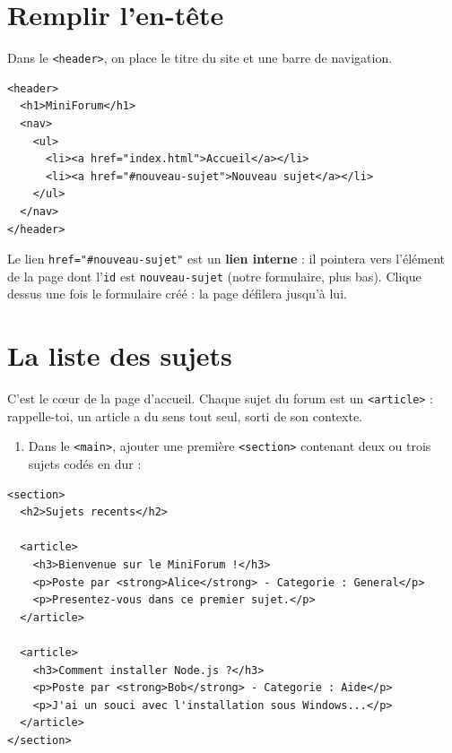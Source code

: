 \documentclass[a4paper,11pt]{article}
\begin{document}
\section{Remplir l'en-tête}

Dans le \texttt{<header>}, on place le titre du site et une barre de navigation.

\begin{lstlisting}[language=HTML5, caption={Contenu du header}]
<header>
  <h1>MiniForum</h1>
  <nav>
    <ul>
      <li><a href="index.html">Accueil</a></li>
      <li><a href="#nouveau-sujet">Nouveau sujet</a></li>
    </ul>
  </nav>
</header>
\end{lstlisting}

\begin{tcolorbox}[astuce, title={Le lien avec le \#}]
Le lien \texttt{href="\#nouveau-sujet"} est un \textbf{lien interne} : il pointera vers l'élément de la page dont l'\texttt{id} est \texttt{nouveau-sujet} (notre formulaire, plus bas). Clique dessus une fois le formulaire créé : la page défilera jusqu'à lui.
\end{tcolorbox}

\section{La liste des sujets}

C'est le cœur de la page d'accueil. Chaque sujet du forum est un \texttt{<article>} : rappelle-toi, un article a du sens tout seul, sorti de son contexte.

\begin{enumerate}
  \item Dans le \texttt{<main>}, ajouter une première \texttt{<section>} contenant deux ou trois sujets codés en dur :
\end{enumerate}

\begin{lstlisting}[language=HTML5, caption={Liste de sujets dans le main}]
<section>
  <h2>Sujets recents</h2>

  <article>
    <h3>Bienvenue sur le MiniForum !</h3>
    <p>Poste par <strong>Alice</strong> - Categorie : General</p>
    <p>Presentez-vous dans ce premier sujet.</p>
  </article>

  <article>
    <h3>Comment installer Node.js ?</h3>
    <p>Poste par <strong>Bob</strong> - Categorie : Aide</p>
    <p>J'ai un souci avec l'installation sous Windows...</p>
  </article>
</section>
\end{lstlisting}
\end{document}
